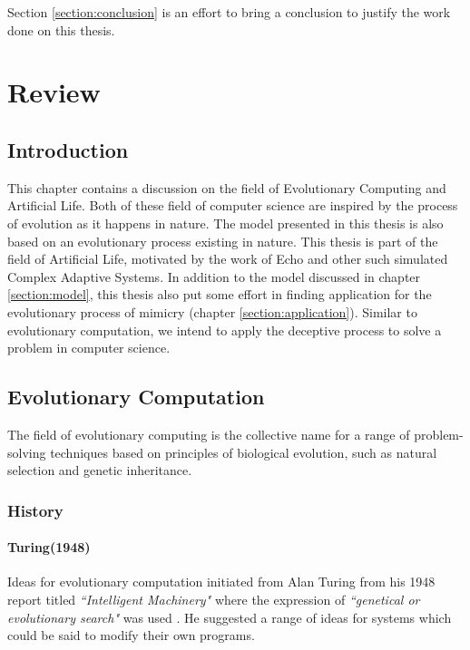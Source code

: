 \documentclass[letterpaper]{article}
\numberwithin{equation}{section}
\begin{document}
Section \ref{section:conclusion} is an effort to bring a conclusion to justify the work done on this thesis. 

\section{Review}
\label{section:review}
\subsection{Introduction}

This chapter contains a discussion on the field of Evolutionary Computing and Artificial Life. Both of these field of computer science are inspired by the process of evolution as it happens in nature. The model presented in this thesis is also based on an evolutionary process existing in nature. This thesis is part of the field of Artificial Life, motivated by the work of Echo \cite{holland1996} and other such simulated Complex Adaptive Systems. In addition to the model discussed in chapter \ref{section:model}, this thesis also put some effort in finding application for the evolutionary process of mimicry (chapter \ref{section:application}). Similar to evolutionary computation, we intend to apply the deceptive process to solve a problem in computer science.

\subsection{Evolutionary Computation}
The field of evolutionary computing is the collective name for a range of problem-solving techniques based on principles of biological evolution, such as natural selection and genetic inheritance. 

\subsubsection{History}
\label{subsubsec:evo-comp-history}

\paragraph{Turing(1948)}
Ideas for evolutionary computation initiated from Alan Turing from his 1948 report titled \textsl{``Intelligent Machinery"} where the expression of \textsl{``genetical or evolutionary search"}  was used \cite{turing1948}. He suggested a range of ideas for systems which could be said to modify their own programs. 
\end{document}

